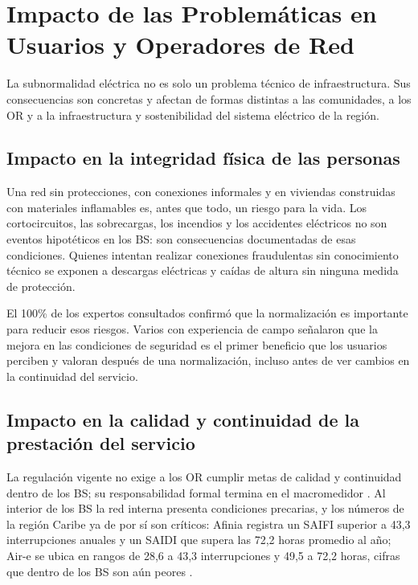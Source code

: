 \section{Impacto de las Problemáticas en Usuarios y Operadores de Red}
\label{sec:impacto}

La subnormalidad eléctrica no es solo un problema técnico de infraestructura. Sus consecuencias son concretas y afectan de formas distintas a las comunidades, a los OR y a la infraestructura y sostenibilidad del sistema eléctrico de la región.

\subsection{Impacto en la integridad física de las personas}
\label{subsec:impacto_fisico}

Una red sin protecciones, con conexiones informales y en viviendas construidas con materiales inflamables es, antes que todo, un riesgo para la vida. Los cortocircuitos, las sobrecargas, los incendios y los accidentes eléctricos no son eventos hipotéticos en los BS: son consecuencias documentadas de esas condiciones. Quienes intentan realizar conexiones fraudulentas sin conocimiento técnico se exponen a descargas eléctricas y caídas de altura sin ninguna medida de protección.

El 100\% de los expertos consultados confirmó que la normalización es importante para reducir esos riesgos. Varios con experiencia de campo señalaron que la mejora en las condiciones de seguridad es el primer beneficio que los usuarios perciben y valoran después de una normalización, incluso antes de ver cambios en la continuidad del servicio.

\subsection{Impacto en la calidad y continuidad de la prestación del servicio}
\label{subsec:impacto_calidad}

La regulación vigente no exige a los OR cumplir metas de calidad y continuidad dentro de los BS; su responsabilidad formal termina en el macromedidor \parencite{VillagranRomero2022}. Al interior de los BS la red interna presenta condiciones precarias, y los números de la región Caribe ya de por sí son críticos: Afinia registra un SAIFI superior a 43,3 interrupciones anuales y un SAIDI que supera las 72,2 horas promedio al año; Air-e se ubica en rangos de 28,6 a 43,3 interrupciones y 49,5 a 72,2 horas, cifras que dentro de los BS son aún peores \parencite{XM2024}.

